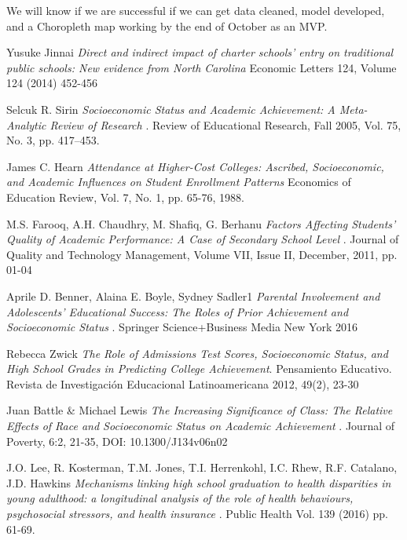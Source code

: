 \documentclass[sigconf,nonacm,11pt]{acmart}
\begin{document}
We will know if we are successful if we can get data cleaned, model developed, and a Choropleth map working by the end of October as an MVP.


\begin{thebibliography}{9}
Yusuke Jinnai
\textit{Direct and indirect impact of charter schools’ entry on traditional public schools: New evidence from North Carolina}
Economic Letters 124, Volume 124 (2014) 452-456

Selcuk R. Sirin
\textit{Socioeconomic Status and Academic Achievement: A Meta-Analytic Review of Research }. 
Review of Educational Research, Fall 2005, Vol. 75, No. 3, pp. 417–453.

James C. Hearn
\textit{Attendance at Higher-Cost Colleges: Ascribed, Socioeconomic, and Academic Influences on Student Enrollment Patterns}
Economics of Education Review, Vol. 7, No.  1, pp. 65-76, 1988.

M.S. Farooq, A.H. Chaudhry, M. Shafiq, G. Berhanu
\textit{Factors Affecting Students' Quality of Academic Performance: A Case of Secondary School Level }.
Journal of Quality and Technology Management, Volume VII, Issue II, December, 2011, pp. 01-04

Aprile D. Benner, Alaina E. Boyle, Sydney Sadler1
\textit{ Parental Involvement and Adolescents’ Educational Success: The Roles of Prior Achievement and Socioeconomic Status }. 
Springer Science+Business Media New York 2016

Rebecca Zwick 
\textit{The Role of Admissions Test Scores, Socioeconomic Status, and High School Grades in Predicting College Achievement}. 
Pensamiento Educativo. Revista de Investigación Educacional Latinoamericana 2012, 49(2), 23-30

Juan Battle \& Michael Lewis
\textit{ The Increasing Significance of Class: The Relative Effects of Race and Socioeconomic Status on Academic Achievement }. 
Journal of Poverty, 6:2, 21-35, DOI: 10.1300/J134v06n02

J.O. Lee, R. Kosterman, T.M. Jones, T.I. Herrenkohl, I.C. Rhew, R.F. Catalano, J.D. Hawkins
\textit{ Mechanisms linking high school graduation to health disparities in young adulthood: a longitudinal analysis of the role of health behaviours, psychosocial stressors, and health insurance }. 
Public Health Vol. 139 (2016) pp. 61-69.


\end{thebibliography}
\end{document}
